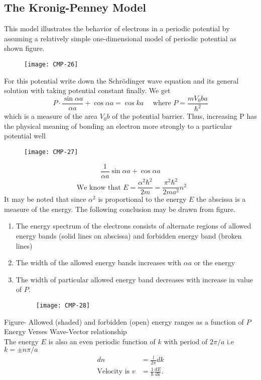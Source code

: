 \subsection{The Kronig-Penney Model}
This model illustrates the behavior of electrons in a periodic potential by assuming a relatively simple one-dimensional model of periodic potential as shown figure.
\begin{figure}[H]
	\centering
	\texttt{[image: CMP-26]}
	\caption{}
	\label{}
\end{figure}
For this potential write down the Schrödinger wave equation and its general solution with taking potential constant finally. We get
$$
P \cdot \frac{\sin \alpha a}{\alpha a}+\cos \alpha a=\cos k a \quad \text { where } P=\frac{m V_{0} b a}{\hbar^{2}}
$$
which is a measure of the area $V_{0} b$ of the potential barrier. Thus, increasing $\mathrm{P}$ has the physical meaning of bonding an electron more strongly to a particular potential well
\begin{figure}[H]
	\centering
	\texttt{[image: CMP-27]}
	\caption{}
	\label{}
\end{figure}
$$\frac{1}{\alpha a} \sin \alpha a+\cos \alpha a$$
$$\text { We know that } E=\frac{\alpha^{2} \hbar^{2}}{2 m}=\frac{\pi^{2} \hbar^{2}}{2 m a^{2}} n^{2}$$
It may be noted that since $\alpha^{2}$ is proportional to the energy $E$ the abscissa is a measure of the energy. The following conclusion may be drawn from figure.
\begin{enumerate}[label=\roman*)]
	\item The energy spectrum of the electrons consists of alternate regions of allowed energy bands (solid lines on abscissa) and forbidden energy band (broken lines)
	\item The width of the allowed energy bands increases with $\alpha a$ or the energy
	\item The width of particular allowed energy band decreases with increase in value of $P$.
	\begin{figure}[H]
		\centering
		\texttt{[image: CMP-28]}
		\caption{}
		\label{}
	\end{figure}
\end{enumerate} 
Figure- Allowed (shaded) and forbidden (open) energy ranges as a function of $P$\\
Energy Verses Wave-Vector relationship\\
The energy $E$ is also an even periodic function of $k$ with period of $2 \pi / a$ i.e $k=\pm n \pi / a$
\begin{align*}
d n&=\frac{l}{2 \pi} d k\\
\text{Velocity is }v&=\frac{1}{\hbar} \frac{d E}{d k}.
\end{align*}

